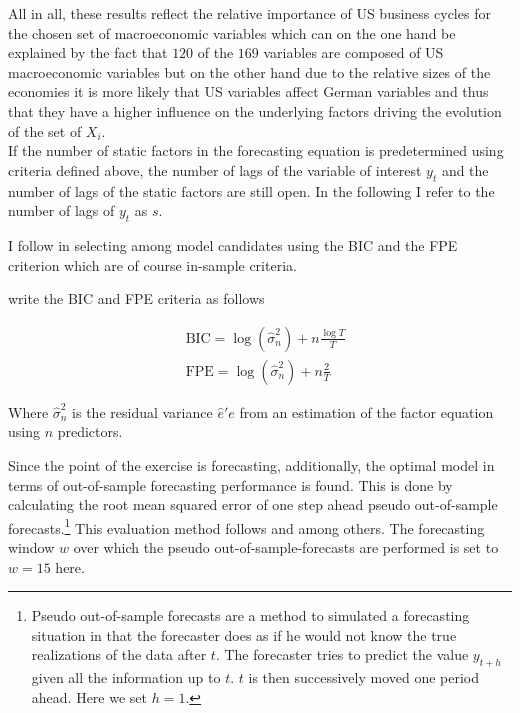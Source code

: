 \documentclass[12pt]{article}
\begin{document}
All in all, these results reflect the relative importance of US business cycles for the chosen set of macroeconomic variables which can on the one hand be explained by the fact that $120$ of the $169$ variables are composed of US macroeconomic variables but on the other hand due to the relative sizes of the economies it is more likely that US variables affect German variables and thus that they have a higher influence on the underlying factors driving the evolution of the set of $X_i$. \\


If the number of static factors in the forecasting equation is predetermined using criteria defined above, the number of lags of the variable of interest $y_t$ and the number of lags of the static factors are still open. In the following I refer to the number of lags of $y_t$ as $s$. 

I follow \citet{bai2008forecasting} in selecting among model candidates using the BIC and the FPE criterion which are of course in-sample criteria. 

\citet{bai2008forecasting} write the BIC and FPE criteria as follows

\begin{equation}
\label{information criteria}
\begin{split}
	& \text{BIC} = \log(\hat \sigma_n^2) + n \frac{\log T}{T} \\ 
	& \text{FPE} = \log(\hat \sigma_n^2) + n \frac{2}{T}
\end{split}
\end{equation}

Where $\hat \sigma_n^2$ is the residual variance $\hat e'e$ from an estimation of the factor equation using $n$ predictors.

Since the point of the exercise is forecasting, additionally, the optimal model in terms of out-of-sample forecasting performance is found. This is done by calculating the root mean squared error of one step ahead pseudo out-of-sample forecasts.\footnote{Pseudo out-of-sample forecasts are a method to simulated a forecasting situation in that the forecaster does as if he would not know the true realizations of the data after $t$. The forecaster tries to predict the value $y_{t+h}$ given all the information up to $t$. $t$ is then successively moved one period ahead. Here we set $h=1$.} This evaluation method follows \citet{forni2005the} and \citet{bai2008forecasting} among others. The forecasting window $w$ over which the pseudo out-of-sample-forecasts are performed is set to $w=15$ here. 
\end{document}
